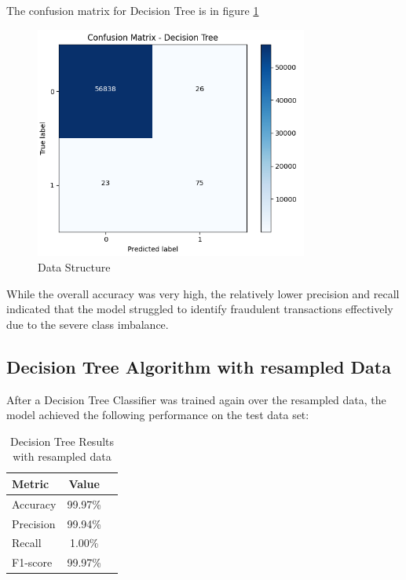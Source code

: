 \documentclass[11pt]{article}
\begin{document}
The confusion matrix for Decision Tree is in figure \ref{fig:confusion_matrix}

\begin{figure}[H]
	\centering
	\includegraphics[width=0.8\textwidth]{figure/confusion_matrix.png}
	\caption{Data Structure}
	\label{fig:confusion_matrix}
\end{figure} 

While the overall accuracy was very high, the relatively lower precision and recall indicated that the model struggled to identify fraudulent transactions effectively due to the severe class imbalance.

\subsection{Decision Tree Algorithm with resampled Data}
After a Decision Tree Classifier was trained again over the resampled data, the model achieved the following performance on the test data set:

\begin{table}[H]
	\centering
	\caption{Decision Tree Results with resampled data}
	\label{tab:decision_tree resample}
	\begin{tabular}{lcc}
		\toprule
		Metric & Value \\
		\midrule
		Accuracy &  99.97\% \\
		Precision &  99.94\% \\
		Recall &  1.00\%  \\
		F1-score &  99.97\% \\              
		\bottomrule
	\end{tabular}
\end{table} 
\end{document}
